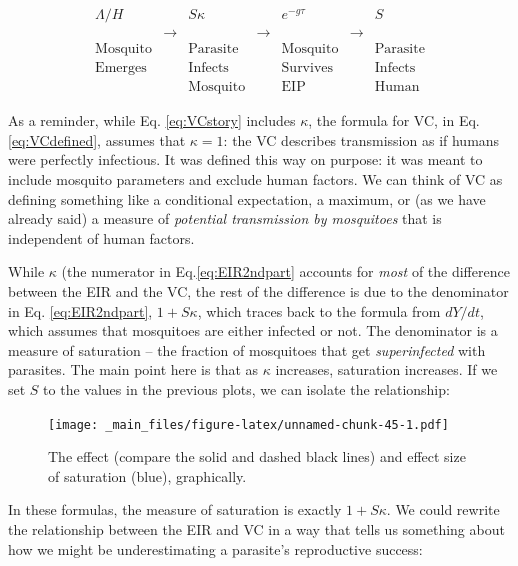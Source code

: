 \documentclass[
]{book}
\begin{document}
\begin{equation}
\begin{array}{|c|c|c|c|c|c|c|}
\Lambda/H &  & S \kappa &  & e^{-g\tau} & & S \\
& \rightarrow &  & \rightarrow &  & \rightarrow &  \\
\mbox{Mosquito} & & \mbox{Parasite} & & \mbox{Mosquito} && \mbox{Parasite} \\
\mbox{Emerges} & & \mbox{Infects} & & \mbox{Survives} && \mbox{Infects} \\
 & & \mbox{Mosquito} & & \mbox{EIP} && \mbox{Human}
\end{array}
\label{eq:VCstory}
\end{equation}

As a reminder, while Eq. \eqref{eq:VCstory} includes \(\kappa\), the formula for VC, in Eq. \eqref{eq:VCdefined}, assumes that \(\kappa=1\): the VC describes transmission as if humans were perfectly infectious. It was defined this way on purpose: it was meant to include mosquito parameters and exclude human factors. We can think of VC as defining something like a conditional expectation, a maximum, or (as we have already said) a measure of \emph{potential transmission by mosquitoes} that is independent of human factors.

While \(\kappa\) (the numerator in Eq.\eqref{eq:EIR2ndpart} accounts for \emph{most} of the difference between the EIR and the VC, the rest of the difference is due to the denominator in Eq. \eqref{eq:EIR2ndpart}, \(1+S\kappa\), which traces back to the formula from \(dY/dt\), which assumes that mosquitoes are either infected or not. The denominator is a measure of saturation -- the fraction of mosquitoes that get \emph{superinfected} with parasites. The main point here is that as \(\kappa\) increases, saturation increases. If we set \(S\) to the values in the previous plots, we can isolate the relationship:

\begin{figure}
\centering
\texttt{[image: \_main\_files/figure-latex/unnamed-chunk-45-1.pdf]}
\caption{\label{fig:unnamed-chunk-45}The effect (compare the solid and dashed black lines) and effect size of saturation (blue), graphically.}
\end{figure}

In these formulas, the measure of saturation is exactly \(1+S\kappa\). We could rewrite the relationship between the EIR and VC in a way
that tells us something about how we might be underestimating a parasite's reproductive success:
\end{document}

